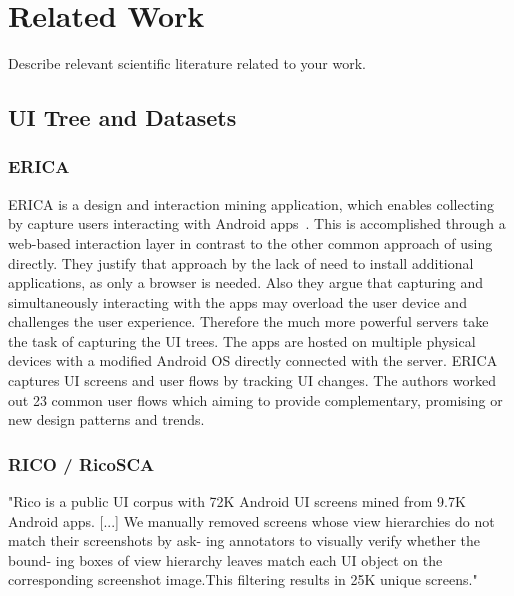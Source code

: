 \chapter{Related Work}

Describe relevant scientific literature related to your work.

\section{UI Tree and Datasets}

\subsection{ERICA}

ERICA is a design and interaction mining application, which enables collecting  by capture users interacting with Android apps~\cite{deka2016erica}.
This is accomplished through a web-based interaction layer in contrast to the other common approach of using  directly.
They justify that approach by the lack of need to install additional applications, as only a browser is needed.
Also they argue that capturing and simultaneously interacting with the apps may overload the user device and challenges the user experience.
Therefore the much more powerful servers take the task of capturing the UI trees.
The apps are hosted on multiple physical devices with a modified Android OS directly connected with the server.
ERICA captures UI screens and user flows by tracking UI changes.
The authors worked out 23 common user flows which aiming to provide complementary, promising or new design patterns and trends.


\subsection{RICO / RicoSCA}

"Rico is a public UI corpus with 72K Android UI
screens mined from 9.7K Android apps. [...]
We manually removed screens whose view
hierarchies do not match their screenshots by ask-
ing annotators to visually verify whether the bound-
ing boxes of view hierarchy leaves match each UI
object on the corresponding screenshot image.This filtering results in 25K unique screens."



